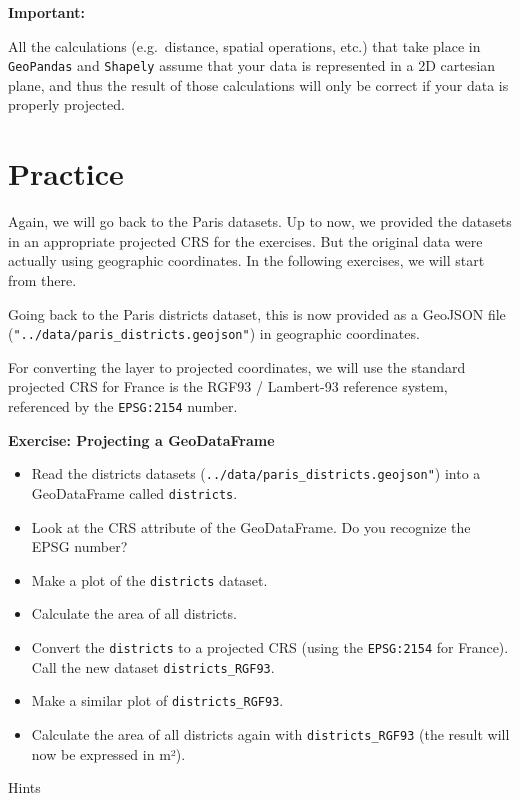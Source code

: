\documentclass[
  letterpaper,
  DIV=11,
  numbers=noendperiod]{scrreprt}
\providecommand{\tightlist}{%
  \setlength{\itemsep}{0pt}\setlength{\parskip}{0pt}}\usepackage{longtable,booktabs,array}
\begin{document}
\textbf{Important:}

All the calculations (e.g.~distance, spatial operations, etc.) that take
place in \texttt{GeoPandas} and \texttt{Shapely} assume that your data
is represented in a 2D cartesian plane, and thus the result of those
calculations will only be correct if your data is properly projected.

\hypertarget{practice-1}{%
\section{Practice}\label{practice-1}}

Again, we will go back to the Paris datasets. Up to now, we provided the
datasets in an appropriate projected CRS for the exercises. But the
original data were actually using geographic coordinates. In the
following exercises, we will start from there.

Going back to the Paris districts dataset, this is now provided as a
GeoJSON file (\texttt{"../data/paris\_districts.geojson"}) in geographic
coordinates.

For converting the layer to projected coordinates, we will use the
standard projected CRS for France is the RGF93 / Lambert-93 reference
system, referenced by the \texttt{EPSG:2154} number.

\textbf{Exercise: Projecting a GeoDataFrame}

\begin{itemize}
\tightlist
\item
  Read the districts datasets
  (\texttt{../data/paris\_districts.geojson"}) into a GeoDataFrame
  called \texttt{districts}.
\item
  Look at the CRS attribute of the GeoDataFrame. Do you recognize the
  EPSG number?
\item
  Make a plot of the \texttt{districts} dataset.
\item
  Calculate the area of all districts.
\item
  Convert the \texttt{districts} to a projected CRS (using the
  \texttt{EPSG:2154} for France). Call the new dataset
  \texttt{districts\_RGF93}.
\item
  Make a similar plot of \texttt{districts\_RGF93}.
\item
  Calculate the area of all districts again with
  \texttt{districts\_RGF93} (the result will now be expressed in m²).
\end{itemize}

Hints
\end{document}
